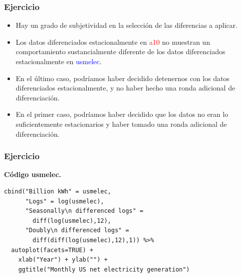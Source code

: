 \documentclass[10pt]{beamer}
\begin{document}
\begin{frame}[fragile]
\frametitle{Ejercicio}

{\small
\begin{itemize}
\item Hay un grado de subjetividad en la selección de las diferencias a aplicar. 
\item Los datos diferenciados estacionalmente en \textcolor{red}{a10} no muestran un comportamiento sustancialmente diferente de los datos diferenciados estacionalmente en \textcolor{blue}{usmelec}. 
\item En el último caso, podríamos haber decidido detenernos con los datos diferenciados estacionalmente, y no haber hecho una ronda adicional de diferenciación. 
\item En el primer caso, podríamos haber decidido que los datos no eran lo suficientemente estacionarios y haber tomado una ronda adicional de diferenciación.
 
\vspace{3mm}

\end{itemize}
}


\end{frame}






\begin{frame}[fragile]
\frametitle{Ejercicio}

\textbf{Código usmelec.}

\lstset{language=r,label= ,caption= ,captionpos=b,numbers=none}
\begin{lstlisting}
cbind("Billion kWh" = usmelec,
      "Logs" = log(usmelec),
      "Seasonally\n differenced logs" =
        diff(log(usmelec),12),
      "Doubly\n differenced logs" =
        diff(diff(log(usmelec),12),1)) %>%
  autoplot(facets=TRUE) +
    xlab("Year") + ylab("") +
    ggtitle("Monthly US net electricity generation")
\end{lstlisting}


\end{frame}


\end{document}
